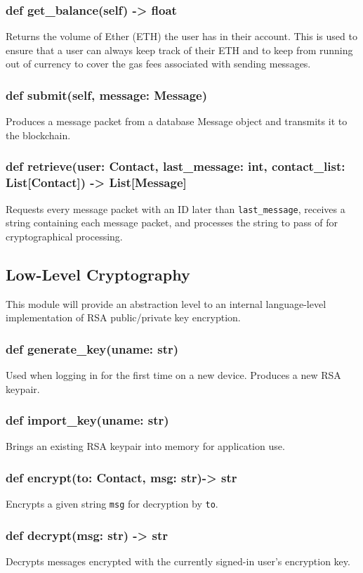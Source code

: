 \documentclass[titlepage]{report}
\begin{document}
\subsubsection{def get\_balance(self) -> float}
Returns the volume of \gls{Ether} (ETH) the user has in their account. This is used to ensure that a user can always keep track of their ETH and to keep from running out of currency to cover the gas fees associated with sending messages.
\subsubsection{def submit(self, message: Message)}
Produces a message packet from a database Message object and transmits it to the \gls{blockchain}.
\subsubsection{def retrieve(user: Contact, last\_message: int, contact\_list: List[Contact]) -> List[Message]}
Requests every message packet with an ID later than \texttt{last\_message}, receives a string containing each message packet, and processes the string to pass of for cryptographical processing.

\subsection{Low-Level Cryptography}
This module will provide an abstraction level to an internal language-level implementation of RSA public/private key encryption.

\subsubsection{def generate\_key(uname: str)}
Used when logging in for the first time on a new device. Produces a new RSA keypair.
\subsubsection{def import\_key(uname: str)}
Brings an existing RSA keypair into memory for application use.
\subsubsection{def encrypt(to: Contact, msg: str)-> str}
Encrypts a given string \texttt{msg} for decryption by \texttt{to}.
\subsubsection{def decrypt(msg: str) -> str}
Decrypts messages encrypted with the currently signed-in user's encryption key.
\end{document}
